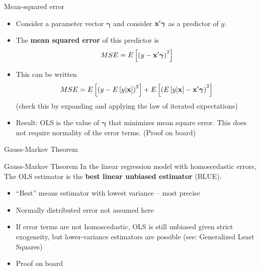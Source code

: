 \begin{frame}{Mean-squared error}
\begin{itemize}
	\item Consider a parameter vector $\boldsymbol{\gamma}$ and consider
	${\bf x}'\boldsymbol{\gamma}$ as a predictor of $y$. 

	\medskip
	\item The {\bf mean squared error} of this predictor is\[
	MSE = E\left[\left( y - {\bf x}' \boldsymbol{\gamma}\right)^{2}\right]
	\]

	\item This can be written\[
	MSE = E\left[ \left(y - E\left[y | {\bf x}\right]\right)^{2}\right] + E\left[  \left(E\left[y | {\bf x}\right]- {\bf x}' \boldsymbol{\gamma}\right)^{2} \right]
	\]
	(check this by expanding and applying the law of iterated expectations)

	\item Result: OLS is the value of $\boldsymbol{\gamma}$ that minimizes mean square error. This does not
	require normality of the error terms. (Proof on board)
	
\end{itemize}
\end{frame}


\begin{frame}{Gauss-Markov Theorem}

\begin{block}{Gauss-Markov Theorem}
In the linear regression model with homoscedastic errors, The OLS estimator 
is the {\bf best linear unbiased estimator} (BLUE).
\end{block}

\begin{itemize}
	\item ``Best'' means estimator with lowest variance -- most precise

	\item Normally distributed error not assumed here

	\item If error terms are not homoscedastic, OLS is still unbiased given strict
	exogeneity, but lower-variance estimators are possible (see: Generalized Least Squares)

	\item Proof on board
	
\end{itemize}
\end{frame}


